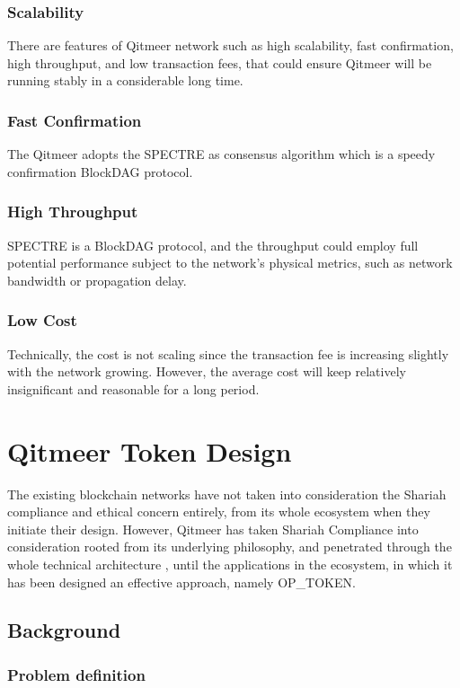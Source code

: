 \documentclass[a4paper,11pt]{article}
\begin{document}
\subsubsection{Scalability}
There are features of Qitmeer network such as high scalability, fast confirmation, high throughput, and low transaction fees, that could ensure Qitmeer will be running stably in a considerable long time.

\subsubsection*{Fast Confirmation}
The Qitmeer adopts the SPECTRE as consensus algorithm which is a speedy confirmation BlockDAG protocol. 
\subsubsection*{High Throughput}
SPECTRE is a BlockDAG protocol, and the throughput could employ full potential performance subject to the network’s physical metrics, such as network bandwidth or propagation delay.
\subsubsection*{Low Cost}
Technically, the cost is not scaling since the transaction fee is increasing slightly with the network growing. However, the average cost will keep relatively insignificant and reasonable for a long period.  

\section{Qitmeer Token Design}
The existing blockchain networks have not taken into consideration the  Shariah compliance and ethical concern entirely, from its whole ecosystem when they initiate their design. However, Qitmeer has taken Shariah Compliance into consideration rooted from its underlying philosophy, and penetrated through the whole technical architecture , until the applications in the ecosystem, in which it has been designed an effective approach, namely OP_TOKEN.

\subsection{Background}
\subsubsection{Problem definition}
\end{document}

